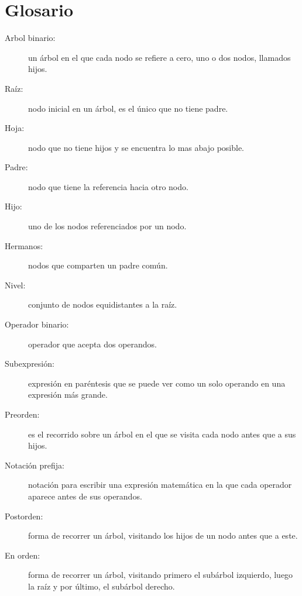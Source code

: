 \section{Glosario}

   
   
   
 
\begin{description}
\item [{Arbol binario:}] un árbol en el que cada nodo se refiere a cero,
uno o dos nodos, llamados hijos.
\item [{Raíz:}] nodo inicial en un árbol, es el único que no tiene padre.
\item [{Hoja:}] nodo que no tiene hijos y se encuentra lo mas abajo posible.
\item [{Padre:}] nodo que tiene la referencia hacia otro nodo.
\item [{Hijo:}] uno de los nodos referenciados por un nodo.
\item [{Hermanos:}] nodos que comparten un padre común.
\item [{Nivel:}] conjunto de nodos equidistantes a la raíz.
\item [{Operador binario:}] operador que acepta dos operandos.
\item [{Subexpresión:}] expresión en paréntesis que se puede ver como un
solo operando en una expresión más grande.
\item [{Preorden:}] es el recorrido sobre un árbol en el que se visita
cada nodo antes que a sus hijos.
\item [{Notación prefija:}] notación para escribir una expresión matemática
en la que cada operador aparece antes de sus operandos.
\item [{Postorden:}] forma de recorrer un árbol, visitando los hijos de
un nodo antes que a este.
\item [{En orden:}] forma de recorrer un árbol, visitando primero el subárbol
izquierdo, luego la raíz y por último, el subárbol derecho.
\end{description}

